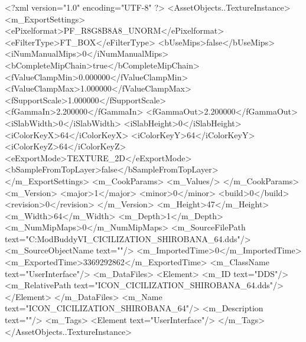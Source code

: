 <?xml version="1.0" encoding="UTF-8" ?>
<AssetObjects..TextureInstance>
	<m_ExportSettings>
		<ePixelformat>PF_R8G8B8A8_UNORM</ePixelformat>
		<eFilterType>FT_BOX</eFilterType>
		<bUseMips>false</bUseMips>
		<iNumManualMips>0</iNumManualMips>
		<bCompleteMipChain>true</bCompleteMipChain>
		<fValueClampMin>0.000000</fValueClampMin>
		<fValueClampMax>1.000000</fValueClampMax>
		<fSupportScale>1.000000</fSupportScale>
		<fGammaIn>2.200000</fGammaIn>
		<fGammaOut>2.200000</fGammaOut>
		<iSlabWidth>0</iSlabWidth>
		<iSlabHeight>0</iSlabHeight>
		<iColorKeyX>64</iColorKeyX>
		<iColorKeyY>64</iColorKeyY>
		<iColorKeyZ>64</iColorKeyZ>
		<eExportMode>TEXTURE_2D</eExportMode>
		<bSampleFromTopLayer>false</bSampleFromTopLayer>
	</m_ExportSettings>
	<m_CookParams>
		<m_Values/>
	</m_CookParams>
	<m_Version>
		<major>1</major>
		<minor>0</minor>
		<build>0</build>
		<revision>0</revision>
	</m_Version>
	<m_Height>47</m_Height>
	<m_Width>64</m_Width>
	<m_Depth>1</m_Depth>
	<m_NumMipMaps>0</m_NumMipMaps>
	<m_SourceFilePath text="C:\Users\asus\Documents\Firaxis ModBuddy\Civilization VI\temppic\ICON_CICILIZATION_SHIROBANA_64.dds"/>
	<m_SourceObjectName text=""/>
	<m_ImportedTime>0</m_ImportedTime>
	<m_ExportedTime>3369292862</m_ExportedTime>
	<m_ClassName text="UserInterface"/>
	<m_DataFiles>
		<Element>
			<m_ID text="DDS"/>
			<m_RelativePath text="ICON_CICILIZATION_SHIROBANA_64.dds"/>
		</Element>
	</m_DataFiles>
	<m_Name text="ICON_CICILIZATION_SHIROBANA_64"/>
	<m_Description text=""/>
	<m_Tags>
		<Element text="UserInterface"/>
	</m_Tags>
</AssetObjects..TextureInstance>

